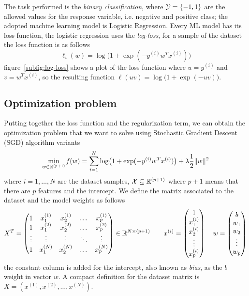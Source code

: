 The task performed is the \emph{binary classification}, where $\mathcal{Y}=\{-1,1\}$ are the allowed values for the response variable, i.e. negative and positive class; the adopted machine learning model is Logistic Regression. Every ML model has its loss function, the logistic regression uses the \emph{log-loss}, for a sample of the dataset the loss function is as follows
\begin{equation}\label{eq:sample_loss}
\ell_i(w)=\log\bigl(1+\exp(-y^{(i)}w^Tx^{(i)})\bigr)
\end{equation}
figure~\vref{subfig:log-loss} shows a plot of the loss function where $u=y^{(i)}$ and $v=w^Tx^{(i)}$, so the resulting function $\ell(uv)=\log\bigl(1+\exp(-uv)\bigr)$.

\subsection{Optimization problem}

Putting together the loss function and the regularization term, we can obtain the optimization problem that we want to solve using Stochastic Gradient Descent (SGD) algorithm variants
\begin{equation}\label{eq:opt-prob}
\min_{w\in\mathbb{R}^{(p+1)}}\operatorname*{\mathit{f}}(w)=\sum_{i=1}^N\log\bigl(1+\exp(-y^{(i)}w^Tx^{(i)})\bigr)+\lambda\frac{1}{2}\lVert w\rVert^2
\end{equation}
where $i=1,\dots,N$ are the dataset samples, $\mathcal{X}\subseteq\mathbb{R}^{(p+1)}$ where $p+1$ means that there are $p$ features and the intercept. %
We define the matrix associated to the dataset and the model weights as follows
\[
X^T=
\begin{pmatrix}
1 & x_1^{(1)} & x_2^{(1)} & \dots & x_p^{(1)} \\
1 & x_1^{(2)} & x_2^{(2)} & \dots & x_p^{(2)} \\
\vdots & \vdots & \vdots & \ddots & \vdots \\
1 & x_1^{(N)} & x_2^{(N)} & \dots & x_p^{(N)}
\end{pmatrix}\in\mathbb{R}^{N\times(p+1)}\qquad
x^{(i)}=
\begin{pmatrix}
1 \\ x_1^{(i)} \\ x_2^{(i)} \\ \vdots \\ x_p^{(i)}
\end{pmatrix}\quad
w=
\begin{pmatrix}
b \\ w_1 \\ w_2 \\ \vdots \\ w_p
\end{pmatrix}
\]
the constant column is added for the intercept, also known as \emph{bias}, as the $b$ weight in vector $w$. A compact definition for the dataset matrix is $X=(x^{(1)},x^{(2)},\dots,x^{(N)})$.%

